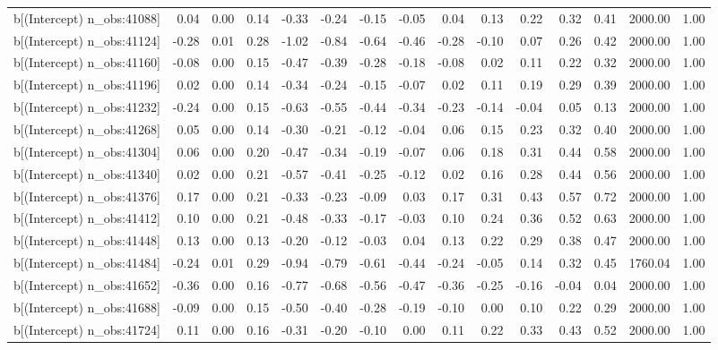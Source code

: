 \begin{table}[ht]
\begin{tabular}{rrrrrrrrrrrrrrr}
  b[(Intercept) n\_obs:41088] & 0.04 & 0.00 & 0.14 & -0.33 & -0.24 & -0.15 & -0.05 & 0.04 & 0.13 & 0.22 & 0.32 & 0.41 & 2000.00 & 1.00 \\ 
  b[(Intercept) n\_obs:41124] & -0.28 & 0.01 & 0.28 & -1.02 & -0.84 & -0.64 & -0.46 & -0.28 & -0.10 & 0.07 & 0.26 & 0.42 & 2000.00 & 1.00 \\ 
  b[(Intercept) n\_obs:41160] & -0.08 & 0.00 & 0.15 & -0.47 & -0.39 & -0.28 & -0.18 & -0.08 & 0.02 & 0.11 & 0.22 & 0.32 & 2000.00 & 1.00 \\ 
  b[(Intercept) n\_obs:41196] & 0.02 & 0.00 & 0.14 & -0.34 & -0.24 & -0.15 & -0.07 & 0.02 & 0.11 & 0.19 & 0.29 & 0.39 & 2000.00 & 1.00 \\ 
  b[(Intercept) n\_obs:41232] & -0.24 & 0.00 & 0.15 & -0.63 & -0.55 & -0.44 & -0.34 & -0.23 & -0.14 & -0.04 & 0.05 & 0.13 & 2000.00 & 1.00 \\ 
  b[(Intercept) n\_obs:41268] & 0.05 & 0.00 & 0.14 & -0.30 & -0.21 & -0.12 & -0.04 & 0.06 & 0.15 & 0.23 & 0.32 & 0.40 & 2000.00 & 1.00 \\ 
  b[(Intercept) n\_obs:41304] & 0.06 & 0.00 & 0.20 & -0.47 & -0.34 & -0.19 & -0.07 & 0.06 & 0.18 & 0.31 & 0.44 & 0.58 & 2000.00 & 1.00 \\ 
  b[(Intercept) n\_obs:41340] & 0.02 & 0.00 & 0.21 & -0.57 & -0.41 & -0.25 & -0.12 & 0.02 & 0.16 & 0.28 & 0.44 & 0.56 & 2000.00 & 1.00 \\ 
  b[(Intercept) n\_obs:41376] & 0.17 & 0.00 & 0.21 & -0.33 & -0.23 & -0.09 & 0.03 & 0.17 & 0.31 & 0.43 & 0.57 & 0.72 & 2000.00 & 1.00 \\ 
  b[(Intercept) n\_obs:41412] & 0.10 & 0.00 & 0.21 & -0.48 & -0.33 & -0.17 & -0.03 & 0.10 & 0.24 & 0.36 & 0.52 & 0.63 & 2000.00 & 1.00 \\ 
  b[(Intercept) n\_obs:41448] & 0.13 & 0.00 & 0.13 & -0.20 & -0.12 & -0.03 & 0.04 & 0.13 & 0.22 & 0.29 & 0.38 & 0.47 & 2000.00 & 1.00 \\ 
  b[(Intercept) n\_obs:41484] & -0.24 & 0.01 & 0.29 & -0.94 & -0.79 & -0.61 & -0.44 & -0.24 & -0.05 & 0.14 & 0.32 & 0.45 & 1760.04 & 1.00 \\ 
  b[(Intercept) n\_obs:41652] & -0.36 & 0.00 & 0.16 & -0.77 & -0.68 & -0.56 & -0.47 & -0.36 & -0.25 & -0.16 & -0.04 & 0.04 & 2000.00 & 1.00 \\ 
  b[(Intercept) n\_obs:41688] & -0.09 & 0.00 & 0.15 & -0.50 & -0.40 & -0.28 & -0.19 & -0.10 & 0.00 & 0.10 & 0.22 & 0.29 & 2000.00 & 1.00 \\ 
  b[(Intercept) n\_obs:41724] & 0.11 & 0.00 & 0.16 & -0.31 & -0.20 & -0.10 & 0.00 & 0.11 & 0.22 & 0.33 & 0.43 & 0.52 & 2000.00 & 1.00 \\ 

\end{tabular}
\end{table}
